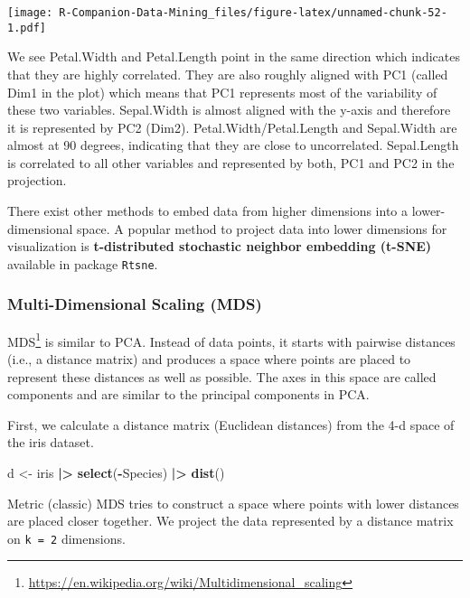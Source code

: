 \documentclass[
  notitlepage]{book}
\newenvironment{Shaded}{\begin{snugshade}}{\end{snugshade}}
\newcommand{\ErrorTok}[1]{\textcolor[rgb]{0.64,0.00,0.00}{\textbf{#1}}}
\newcommand{\KeywordTok}[1]{\textcolor[rgb]{0.13,0.29,0.53}{\textbf{#1}}}
\newcommand{\NormalTok}[1]{#1}
\newcommand{\OperatorTok}[1]{\textcolor[rgb]{0.81,0.36,0.00}{\textbf{#1}}}
\newcommand{\StringTok}[1]{\textcolor[rgb]{0.31,0.60,0.02}{#1}}
\DeclareRobustCommand{\href}[2]{#2\footnote{\url{#1}}}
\begin{document}
\texttt{[image: R-Companion-Data-Mining\_files/figure-latex/unnamed-chunk-52-1.pdf]}

We see Petal.Width and Petal.Length point in the same direction which
indicates that they are highly correlated. They are also roughly aligned
with PC1 (called Dim1 in the plot) which means that PC1 represents most
of the variability of these two variables. Sepal.Width is almost aligned
with the y-axis and therefore it is represented by PC2 (Dim2).
Petal.Width/Petal.Length and Sepal.Width are almost at 90 degrees,
indicating that they are close to uncorrelated. Sepal.Length is
correlated to all other variables and represented by both, PC1 and PC2
in the projection.

There exist other methods to embed data from higher dimensions into a
lower-dimensional space. A popular method to project data into lower
dimensions for visualization is \textbf{t-distributed stochastic neighbor
embedding (t-SNE)} available in package \texttt{Rtsne}.

\hypertarget{multi-dimensional-scaling-mds}{%
\subsubsection{Multi-Dimensional Scaling (MDS)}\label{multi-dimensional-scaling-mds}}

\href{https://en.wikipedia.org/wiki/Multidimensional_scaling}{MDS} is similar
to PCA. Instead of data points, it starts with pairwise distances (i.e.,
a distance matrix) and produces a space where points are placed to
represent these distances as well as possible. The axes in this space
are called components and are similar to the principal components in
PCA.

First, we calculate a distance matrix (Euclidean distances) from the 4-d
space of the iris dataset.

\begin{Shaded}
\begin{Highlighting}[]
\NormalTok{d \textless{}{-}}\StringTok{ }\NormalTok{iris }\OperatorTok{|}\ErrorTok{\textgreater{}}\StringTok{ }
\StringTok{  }\KeywordTok{select}\NormalTok{(}\OperatorTok{{-}}\NormalTok{Species) }\OperatorTok{|}\ErrorTok{\textgreater{}}\StringTok{ }
\StringTok{  }\KeywordTok{dist}\NormalTok{()}
\end{Highlighting}
\end{Shaded}

Metric (classic) MDS tries to construct a space where points with lower
distances are placed closer together. We project the data represented by
a distance matrix on \texttt{k\ =\ 2} dimensions.
\end{document}
